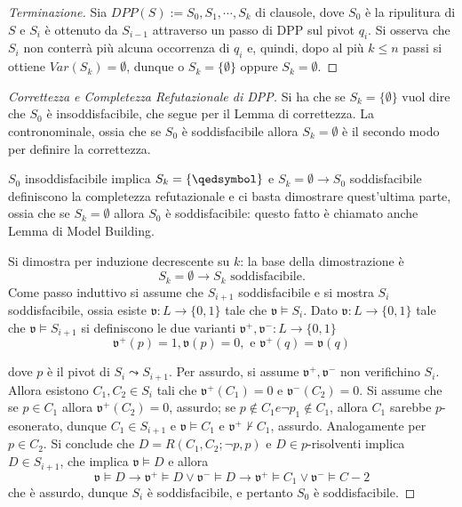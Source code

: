 \begin{proof}[Terminazione]
        Sia $DPP(S) := S_0, S_1, \cdots, S_k$ di clausole, dove
        $S_0$ è la ripulitura di $S$ e $S_i$ è ottenuto da $S_{i-1}$ attraverso un 
        passo di DPP sul pivot $q_i$.
        Si osserva che $S_i$ non conterrà più alcuna occorrenza di $q_i$ e, quindi, 
        dopo al più $k \leq n$ passi si ottiene $Var(S_k) = \emptyset$, dunque 
        o $S_k = \{ \emptyset\}$ oppure $S_k = \emptyset$. 
\end{proof}

\begin{proof}[Correttezza e Completezza Refutazionale di DPP]
        Si ha che se $S_k = \{\emptyset\}$ vuol dire che $S_0$ è insoddisfacibile, 
        che segue per il Lemma di correttezza. La contronominale, 
        ossia che se $S_0$ è soddisfacibile allora $S_k = \emptyset$ è il secondo 
        modo per definire la correttezza. 

        $S_0$ insoddisfacibile implica $S_k = \{\qedsymbol\}$ e $S_k = \emptyset \rightarrow S_0$ 
        soddisfacibile definiscono la completezza refutazionale e ci basta dimostrare 
        quest'ultima parte, ossia che se $S_k = \emptyset$ allora $S_0$ è soddisfacibile: 
        questo fatto è chiamato anche Lemma di Model Building. 
        
        Si dimostra per induzione decrescente su $k$: la 
        base della dimostrazione è 
        $$
        S_k = \emptyset \rightarrow S_k \text{ soddisfacibile.}
        $$
        Come passo induttivo si assume che $S_{i+1}$ soddisfacibile e si mostra $S_i$ 
        soddisfacibile, ossia esiste $\mathfrak{v}: L \rightarrow \{0,1\}$ tale 
        che $\mathfrak{v} \models S_i$. Dato $\mathfrak{v} : L \rightarrow \{0,1\}$ 
        tale che $\mathfrak{v} \models S_{i+1}$ si definiscono le due varianti 
        $\mathfrak{v}^+, \mathfrak{v}^-: L \rightarrow \{0,1\}$ 
        $$
        \mathfrak{v}^+(p) = 1, \mathfrak{v}(p) = 0, \text{ e } \mathfrak{v}^+(q) = \mathfrak{v}(q) 
        $$

        dove $p$ è il pivot di $S_i \leadsto S_{i+1}$. 
        Per assurdo, si assume $\mathfrak{v}^+, \mathfrak{v}^-$ non verifichino 
        $S_{i}$. Allora esistono $C_1, C_2 \in S_i$ tali che $\mathfrak{v}^+(C_1) = 0$ 
        e $\mathfrak{v}^-(C_2) = 0$. Si assume che
        se $p \in C_1$ allora $\mathfrak{v}^+(C_2) = 0$, assurdo; se 
        $p \notin C_1 e \neg p_1 \notin C_1$, allora $C_1$ sarebbe $p$-esonerato, 
        dunque $C_1 \in S_{i+1}$ e $\mathfrak{v} \models C_1$ e $\mathfrak{v}^+ \nvdash C_1$, 
        assurdo. 
        Analogamente per $p \in C_2$. Si conclude che 
        $D = R(C_1, C_2; \neg p, p)$ e $D \in p$-risolventi implica $D \in S_{i+1}$, 
        che implica $\mathfrak{v} \models D$ e allora 
        $$
        \mathfrak{v} \models D \rightarrow \mathfrak{v}^+ \models D \lor \mathfrak{v}^- \models D \rightarrow \mathfrak{v}^+ \models C_1 \lor \mathfrak{v}^- \models C-2
        $$
        che è assurdo, dunque $S_i$ è soddisfacibile, e pertanto $S_0$ è soddisfacibile.
\end{proof}

